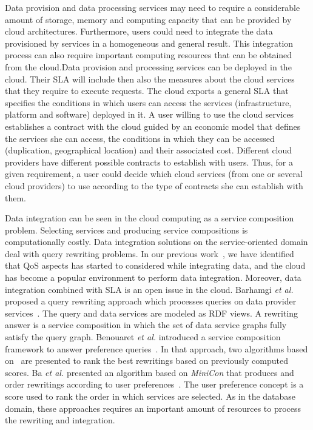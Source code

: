 \documentclass[11pt,a4paper,oneside]{report}
\begin{document}
Data provision and data processing services may need to require a considerable amount of storage, memory and computing capacity that can be provided by cloud architectures. Furthermore, users could need to integrate the data provisioned by services in a homogeneous and general result. This integration process can also require important computing resources that can be obtained from the cloud.Data provision and processing services can be deployed in the cloud. Their SLA will include then also the measures about the cloud services that they require to execute requests. The cloud exports a general SLA that specifies the conditions in which users can access the services (infrastructure, platform and software) deployed in it. A user willing to use the cloud services establishes a contract with the cloud guided by an economic model that defines the services she can access, the conditions in which they can be accessed (duplication, geographical location) and their associated cost. Different cloud providers have different possible contracts to establish with users. Thus, for a given requirement, a user could decide which cloud services (from one or several cloud providers) to use according to the type of contracts she can establish with them.

Data integration can be seen in the cloud computing as a service composition problem. Selecting services and producing service compositions is computationally costly. %
Data integration solutions on the service-oriented domain deal with query rewriting problems. 
In our previous work~\cite{Carvalho2015}, we have identified that QoS aspects has started to considered while integrating data, and the cloud has become a popular environment to perform data integration. Moreover, data integration combined with SLA is an open issue in the cloud. 
%
Barhamgi \textit{et al.} proposed a query rewriting approach which processes queries on data provider services~\cite{Barhamgi2010}. The query and data services are modeled as RDF views. A rewriting answer is a service composition in which the set of data service graphs fully satisfy the query graph.  
%
Benouaret \textit{et al.} introduced a service composition framework to answer preference queries~\cite{Benouaret2011}. In that approach, two algorithms based on~\cite{Barhamgi2010} are presented to rank the best rewritings based on previously computed scores.
%
Ba \textit{et al.} presented an algorithm based on \textit{MiniCon} that produces and order rewritings according to user preferences~\cite{ba2014}. The user preference concept is a score used to rank the order in which services are selected.
%
As in the database domain, these approaches requires an important amount of resources to process the rewriting and integration. 
%
\end{document}

